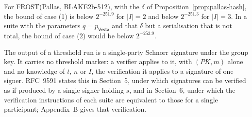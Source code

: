 \documentclass[11pt,a4paper]{article}
\theoremstyle{definition}
\newcommand{\Vesta}{\ensuremath{\mathsf{Vesta}}}
\begin{document}
For FROST(Pallas, BLAKE2b-512), with the \(\delta\) of
Proposition~\ref{prop:pallas-hash}, the bound of case (1) is below
\(2^{-251.9}\) for \(\lvert I \rvert = 2\) and below \(2^{-251.3}\) for
\(\lvert I \rvert = 3\). In a suite with the parameters \(q = p_{\Vesta}\)
and that \(\delta\) but a serialisation that is not total, the bound of
case (2) would be below \(2^{-253.9}\).

The output of a threshold run is a single-party Schnorr signature under the
group key. It carries no threshold marker: a verifier applies to it, with
\((\mathit{PK}, m)\) alone and no knowledge of \(t\), \(n\) or \(I\), the
verification it applies to a signature of one signer. RFC~9591 states this
in Section~5, under which signatures can be verified as if produced by a
single signer holding \(s\), and in Section~6, under which the verification
instructions of each suite are equivalent to those for a single
participant; Appendix~B gives that verification.
\end{document}
